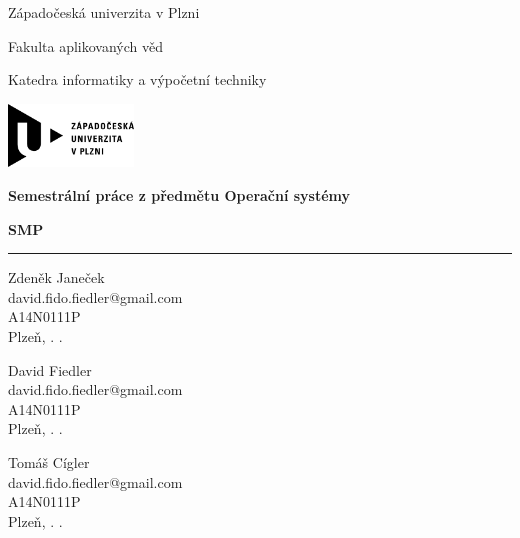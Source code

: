 \documentclass[a4paper,12pt]{article}
\begin{document}
\begin{titlepage}

\sffamily	%

	\begin{center}
		\begin{Large}
		
		Západočeská univerzita v Plzni

		\vspace*{0.2cm}
		
		Fakulta aplikovaných věd

		\vspace*{0.2cm}
		
		Katedra informatiky a výpočetní techniky
		
		\vspace*{5mm}

		\includegraphics[width=0.25\textwidth]{obrazky/logo_zcu}	
		
		\vspace*{2cm}
		
		{\Huge\bfseries Semestrální práce z předmětu Operační systémy}

		\vspace*{1cm}
		
		{\bfseries SMP}
		\end{Large}
	\end{center}
	
	\vfill

	\hrule
	
	\vspace*{0.2cm}	
	
	\noindent
	Zdeněk Janeček \\ 
	david.fido.fiedler@gmail.com \\
	A14N0111P \\
	Plzeň, \number\day. \number\month. \number\year

	\vspace*{0.2cm}	
	
	\noindent
	David Fiedler \\ 
	david.fido.fiedler@gmail.com \\
	A14N0111P \\
	Plzeň, \number\day. \number\month. \number\year
	
	\vspace*{0.2cm}	
	
	\noindent
	Tomáš Cígler \\ 
	david.fido.fiedler@gmail.com \\
	A14N0111P \\
	Plzeň, \number\day. \number\month. \number\year

\rmfamily	%

\end{titlepage}
\end{document}
